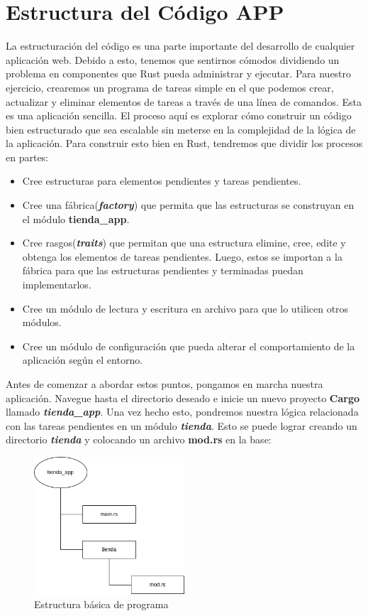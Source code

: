 \section{Estructura del Código APP}

La estructuración del código es una parte importante del desarrollo de cualquier aplicación web. Debido a esto, tenemos que sentirnos cómodos dividiendo un problema en componentes que Rust pueda administrar y ejecutar. Para nuestro ejercicio, crearemos un programa de tareas simple en el que podemos crear, actualizar y eliminar elementos de tareas a través de una línea de comandos. Esta es una aplicación sencilla. El proceso aquí es explorar cómo construir un código bien estructurado que sea escalable sin meterse en la complejidad de la lógica de la aplicación. Para construir esto bien en Rust, tendremos que dividir los procesos en partes:

\begin{itemize}
	\item Cree estructuras para elementos pendientes y tareas pendientes.
	\item Cree una fábrica(\textit{\textbf{factory}}) que permita que las estructuras se construyan en el módulo \textbf{tienda\_app}.
	\item Cree rasgos(\textit{\textbf{traits}}) que permitan que una estructura elimine, cree, edite y obtenga los elementos de tareas pendientes. Luego, estos se importan a la fábrica para que las estructuras pendientes y terminadas puedan implementarlos.
	\item Cree un módulo de lectura y escritura en archivo para que lo utilicen otros módulos.
	\item Cree un módulo de configuración que pueda alterar el comportamiento de la aplicación según el entorno.
\end{itemize}

Antes de comenzar a abordar estos puntos, pongamos en marcha nuestra aplicación. Navegue hasta el directorio deseado e inicie un nuevo proyecto \textbf{Cargo} llamado \textbf{\textit{tienda\_app}}. Una vez hecho esto, pondremos nuestra lógica relacionada con las tareas pendientes en un módulo \textbf{\textit{tienda}}. Esto se puede lograr creando un directorio \textbf{\textit{tienda}} y colocando un archivo \textbf{mod.rs} en la base:

\begin{figure}[htb]
	\centering
	\includegraphics[width=0.5\textwidth]{capitulo1/estructura_basica.png}
	\caption{Estructura básica de programa}
	\label{cap1:001}
\end{figure} 

